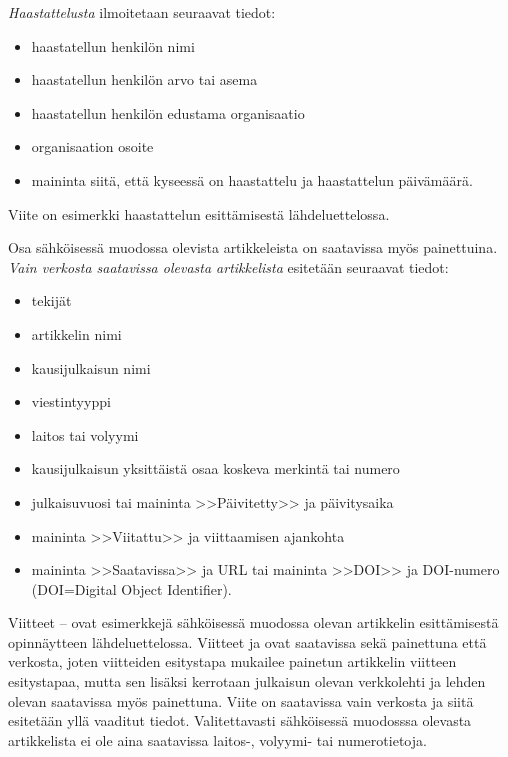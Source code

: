 \documentclass[finnish, 12pt, a4paper, arts, utf8, a-2b, online]{aaltothesis}
\begin{document}
\noindent
\textit{Haastattelusta} ilmoitetaan seuraavat tiedot:
\begin{itemize}
	\setlength{\itemsep}{-3pt}
	\item[--]haastatellun henkilön nimi
	\item[--]haastatellun henkilön arvo tai asema
	\item[--]haastatellun henkilön edustama organisaatio
	\item[--]organisaation osoite
	\item[--]maininta siitä, että kyseessä on haastattelu ja haastattelun
	päivämäärä. 
\end{itemize}
Viite \cite{haastattelu} on esimerkki haastattelun esittämisestä 
lähdeluettelossa.

\noindent
Osa sähköisessä muodossa olevista artikkeleista on saatavissa myös
painettuina. \textit{Vain verkosta saatavissa olevasta artikkelista} esitetään
seuraavat tiedot:
\begin{itemize}
	\setlength{\itemsep}{-3pt}
	\item[--]tekijät
	\item[--]artikkelin nimi
	\item[--]kausijulkaisun nimi
	\item[--]viestintyyppi
	\item[--]laitos tai volyymi
	\item[--]kausijulkaisun yksittäistä osaa koskeva merkintä tai numero
	\item[--]julkaisuvuosi tai maininta >>Päivitetty>> ja päivitysaika
	\item[--]maininta >>Viitattu>> ja viittaamisen ajankohta 
	\item[--]maininta >>Saatavissa>> ja URL tai 
	maininta >>DOI>> ja DOI-numero (DOI=Digital Object Identifier).
\end{itemize}
Viitteet \cite{Ribeiro}--\cite{kone} ovat esimerkkejä sähköisessä muodossa 
olevan artikkelin esittämisestä opinnäytteen lähdeluettelossa. Viitteet 
\cite{Ribeiro} ja \cite{Stieber} ovat saatavissa sekä painettuna että verkosta, 
joten viitteiden esitystapa mukailee painetun artikkelin viitteen esitystapaa, 
mutta sen lisäksi kerrotaan julkaisun olevan verkkolehti ja lehden olevan 
saatavissa myös painettuna.  Viite \cite{kone} on saatavissa vain verkosta ja
siitä esitetään yllä vaaditut tiedot. Valitettavasti sähköisessä muodosssa 
olevasta artikkelista ei ole aina saatavissa lai\-tos-, volyymi- tai 
numerotietoja.
\end{document}
